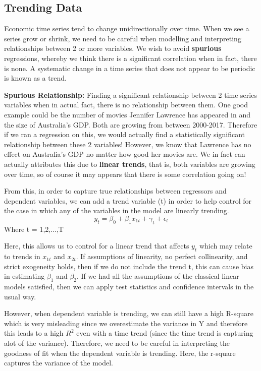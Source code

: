 \documentclass[11pt, oneside]{article}
\theoremstyle{definition}
\begin{document}
\subsection{Trending Data}
Economic time series tend to change unidirectionally over time. When we see a series grow or shrink, we need to be careful when modelling and interpreting relationships between 2 or more variables. We wish to avoid \textbf{spurious} regressions, whereby we think there is a significant correlation when in fact, there is none. A systematic change in a time series that does not appear to be periodic is known as a trend.


\textbf{Spurious Relationship:} Finding a significant relationship between 2 time series variables when in actual fact, there is no relationship between them. One good example could be the number of movies Jennifer Lawrence has appeared in and the size of Australia's GDP. Both are growing from between 2000-2017. Therefore if we ran a regression on this, we would actually find a statistically significant relationship between these 2 variables! However, we know that Lawrence has no effect on Australia's GDP no matter how good her movies are. We in fact can actually attributes this due to \textbf{linear trends}, that is, both variables are growing over time, so of course it may appears that there is some correlation going on!

From this, in order to capture true relationships between regressors and dependent variables, we can add a trend variable (t) in order to help control for the case in which any of the variables in the model are linearly trending.
$$
y_t = \beta_0 + \beta_1 x_{1t} + \gamma_{t} + \epsilon_{t}
$$
Where t = 1,2,...,T

Here, this allows us to control for a linear trend that affects $y_t$ which may relate to trends in $x_{1t}$ and $x_{2t}$. If assumptions of linearity, no perfect collinearity, and strict exogeneity holds, then if we do not include the trend t, this can cause bias in estimating $\beta_1$ and $\beta_2$. If we had all the assumptions of the classical linear models satisfied, then we can apply test statistics and confidence intervals in the usual way.

However, when dependent variable is trending, we can still have a high R-square which is very misleading since we overestimate the variance in Y and therefore this leads to a high $R^2$ even with a time trend (since the time trend is capturing alot of the variance). Therefore, we need to be careful in interpreting the goodness of fit when the dependent variable is trending. Here, the r-square captures the variance of the model.
\end{document}
